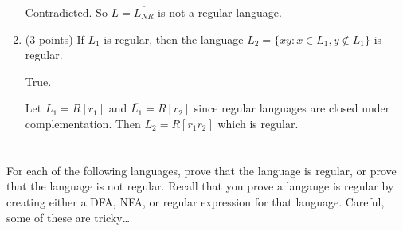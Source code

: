 \documentclass[paper=a4, fontsize=11pt]{scrartcl} %
\begin{document}
\begin{enumerate}
  Contradicted. So $L = \overline{L_{NR}}$ is not a regular language.

\item
  \begin{fancyquotes}
    (3 points) If $L_1$ is regular, then the language $L_2 = \{xy :
    x\in L_1, y \not\in L_1\}$ is regular.
  \end{fancyquotes}

  True.

  Let $L_1 = R[r_1]$ and $\overline{L_1} = R[r_2]$ since regular
  languages are closed under complementation.
  Then $L_2 = R[r_1r_2]$ which is regular.
\end{enumerate}


\section{}

\begin{fancyquotes}
  For each of the following languages, prove that the language is
  regular, or prove that the language is not regular. Recall that you
  prove a langauge is regular by creating either a DFA, NFA, or
  regular expression for that language. Careful, some of these are
  tricky\dots
\end{fancyquotes}
\end{document}
